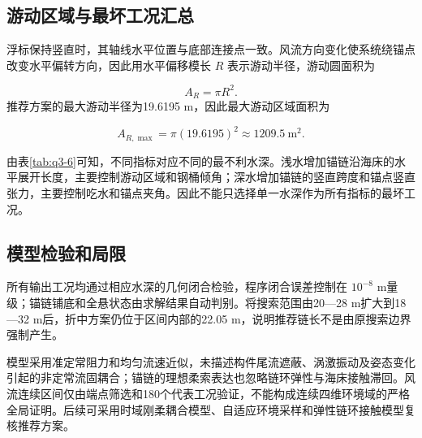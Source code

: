 \subsection{游动区域与最坏工况汇总}
浮标保持竖直时，其轴线水平位置与底部连接点一致。风流方向变化使系统绕锚点改变水平偏转方向，因此用水平偏移模长 \(R\) 表示游动半径，游动圆面积为

\[
A_R=\pi R^2. \tag{18}
\]
推荐方案的最大游动半径为19.6195 m，因此最大游动区域面积为

\[
A_{R,\max}=\pi(19.6195)^2
\approx1209.5\ \mathrm{m^2}.
\]
\begin{table}[H]\centering\small
\caption{推荐方案的最坏工况及约束校核}
\label{tab:q3-6}
\end{table}
由表\ref{tab:q3-6}可知，不同指标对应不同的最不利水深。浅水增加锚链沿海床的水平展开长度，主要控制游动区域和钢桶倾角；深水增加锚链的竖直跨度和锚点竖直张力，主要控制吃水和锚点夹角。因此不能只选择单一水深作为所有指标的最坏工况。

\subsection{模型检验和局限}
所有输出工况均通过相应水深的几何闭合检验，程序闭合误差控制在 \(10^{-8}\) m量级；锚链铺底和全悬状态由求解结果自动判别。将搜索范围由20—28 m扩大到18—32 m后，折中方案仍位于区间内部的22.05 m，说明推荐链长不是由原搜索边界强制产生。

模型采用准定常阻力和均匀流速近似，未描述构件尾流遮蔽、涡激振动及姿态变化引起的非定常流固耦合；锚链的理想柔索表达也忽略链环弹性与海床接触滞回。风流连续区间仅由端点筛选和180个代表工况验证，不能构成连续四维环境域的严格全局证明。后续可采用时域刚柔耦合模型、自适应环境采样和弹性链环接触模型复核推荐方案。

